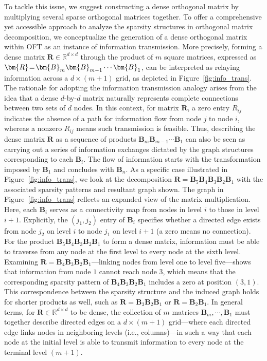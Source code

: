 To tackle this issue, we suggest constructing a dense orthogonal matrix by multiplying several sparse orthogonal matrices together. To offer a comprehensive yet accessible approach to analyze the sparsity structures in orthogonal matrix decomposition, we conceptualize the generation of a dense orthogonal matrix within OFT as an instance of information transmission. More precisely, forming a dense matrix $\bm{R}\in\mathbb{R}^{d\times d}$ through the product of $m$ square matrices, expressed as $\thickmuskip=2mu \medmuskip=2mu \bm{R}=\bm{B}_m\bm{B}_{m-1}\cdots\bm{B}_1$, can be interpreted as relaying information across a $d\times (m+1)$ grid, as depicted in Figure~\ref{fig:info_trans}. The rationale for adopting the information transmission analogy arises from the idea that a dense $d$-by-$d$ matrix naturally represents complete connections between two sets of $d$ nodes. In this context, for matrix $\bm{R}$, a zero entry $R_{ij}$ indicates the absence of a path for information flow from node $j$ to node $i$, whereas a nonzero $R_{ij}$ means such transmission is feasible. Thus, describing the dense matrix $\bm{R}$ as a sequence of products $\bm{B}_m\bm{B}_{m-1}\cdots\bm{B}_1$ can also be seen as carrying out a series of information exchanges dictated by the graph structures corresponding to each $\bm{B}_i$. The flow of information starts with the transformation imposed by $\bm{B}_1$ and concludes with $\bm{B}_n$. As a specific case illustrated in Figure~\ref{fig:info_trans}, we look at the decomposition $\bm{R}=\bm{B}_5\bm{B}_4\bm{B}_3\bm{B}_2\bm{B}_1$ with the associated sparsity patterns and resultant graph shown. The graph in Figure~\ref{fig:info_trans} reflects an expanded view of the matrix multiplication. Here, each $\bm{B}_i$ serves as a connectivity map from nodes in level $i$ to those in level $i+1$. Explicitly, the $(j_1,j_2)$ entry of $\bm{B}_i$ specifies whether a directed edge exists from node $j_2$ on level $i$ to node $j_1$ on level $i+1$ (a zero means no connection). For the product $\bm{B}_5\bm{B}_4\bm{B}_3\bm{B}_2\bm{B}_1$ to form a dense matrix, information must be able to traverse from any node at the first level to every node at the sixth level. Examining $\bm{R}=\bm{B}_4\bm{B}_3\bm{B}_2\bm{B}_1$—linking nodes from level one to level five—shows that information from node $1$ cannot reach node $3$, which means that the corresponding sparsity pattern of $\bm{B}_4\bm{B}_3\bm{B}_2\bm{B}_1$ includes a zero at position $(3,1)$. This correspondence between the sparsity structure and the induced graph holds for shorter products as well, such as $\bm{R}=\bm{B}_3\bm{B}_2\bm{B}_1$ or $\bm{R}=\bm{B}_2\bm{B}_1$. In general terms, for $\bm{R}\in\mathbb{R}^{d\times d}$ to be dense, the collection of $m$ matrices $\bm{B}_m,\cdots,\bm{B}_1$ must together describe directed edges on a $d\times (m+1)$ grid—where each directed edge links nodes in neighboring levels (i.e., columns)—in such a way that each node at the initial level is able to transmit information to every node at the terminal level $(m+1)$.

